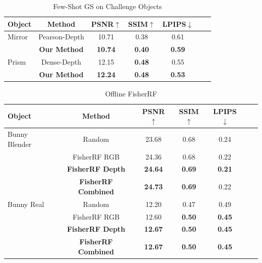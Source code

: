 \documentclass[letterpaper, 10 pt, conference]{ieeeconf}  %
\begin{document}
\begin{table}[ht]
    \vspace{-2mm}
\begin{center}
\begin{tabular}{lcccccc}
\toprule
Object&Method & PSNR$\uparrow$ & SSIM$\uparrow$ & LPIPS$\downarrow$\hspace{-2mm} \\
\midrule
Mirror&Pearson-Depth  & 10.71 & 0.38 &  0.61 \\
&\textbf{Our Method}  & \textbf{10.74} & \textbf{0.40} & \textbf{0.59} \\
\hline
Prism&Dense-Depth  & 12.15 & \textbf{0.48} & 0.55 \\
&\textbf{Our Method}  & \textbf{12.24} & \textbf{0.48} & \textbf{0.53} \\
\hline
\end{tabular}
\caption{Few-Shot GS on Challenge Objects}
\label{tab:realworldchallengeresults}
\end{center}
\vspace{-4  mm}
\end{table}

\begin{table}[ht]
    \vspace{-2mm}
\begin{center}
\begin{tabular}{lcccccc}
\toprule
Object&Method & PSNR$\uparrow$ & SSIM$\uparrow$ & LPIPS$\downarrow$\hspace{-2mm} \\
\midrule
Bunny Blender&Random  & 23.68 & 0.68 &  0.24 \\
&FisherRF RGB  & 24.36 & 0.68 & 0.22 \\
&\textbf{FisherRF Depth}  & \textbf{24.64} & \textbf{0.69} & \textbf{0.21} \\
&\textbf{FisherRF Combined}  & \textbf{24.73} & \textbf{0.69} & 0.22 \\
\hline
Bunny Real&Random  & 12.20 & 0.47 & 0.49 \\
&FisherRF RGB  & 12.60 & \textbf{0.50} & \textbf{0.45} \\
&\textbf{FisherRF Depth}  & \textbf{12.67} & \textbf{0.50} & \textbf{0.45} \\
&\textbf{FisherRF Combined}  & \textbf{12.67} & \textbf{0.50} & \textbf{0.45} \\
\hline
\end{tabular}
\caption{Offline FisherRF}
\label{tab:realworldresultsoffline}
\end{center}
 \vspace{-5mm}
\end{table}
\end{document}
